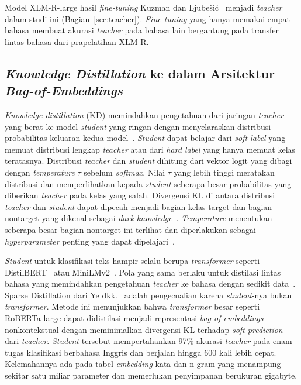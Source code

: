 \documentclass{ieeeaccess}
\newcommand{\en}[1]{\textit{#1}}
\begin{document}
Model XLM-R-large hasil \en{fine-tuning} Kuzman dan Ljube\v{s}i\'c~\cite{kuzman2025llm} menjadi \en{teacher} dalam studi ini (Bagian~\ref{sec:teacher}). \en{Fine-tuning} yang hanya memakai empat bahasa membuat akurasi \en{teacher} pada bahasa lain bergantung pada transfer lintas bahasa dari prapelatihan XLM-R.

\subsection{\en{Knowledge Distillation} ke dalam Arsitektur \en{Bag-of-Embeddings}}
\label{sec:rw-kd}
\en{Knowledge distillation} (KD) memindahkan pengetahuan dari jaringan \en{teacher} yang berat ke model \en{student} yang ringan dengan menyelaraskan distribusi probabilitas keluaran kedua model~\cite{hinton2015distilling,gou2021kdsurvey,gupta2022compression}. \en{Student} dapat belajar dari \en{soft label} yang memuat distribusi lengkap \en{teacher} atau dari \en{hard label} yang hanya memuat kelas teratasnya. Distribusi \en{teacher} dan \en{student} dihitung dari vektor logit yang dibagi dengan \en{temperature} $\tau$ sebelum \en{softmax}. Nilai $\tau$ yang lebih tinggi meratakan distribusi dan memperlihatkan kepada \en{student} seberapa besar probabilitas yang diberikan \en{teacher} pada kelas yang salah. Divergensi KL di antara distribusi \en{teacher} dan \en{student} dapat dipecah menjadi bagian kelas target dan bagian nontarget yang dikenal sebagai \en{dark knowledge}~\cite{zhao2022dkd}. \en{Temperature} menentukan seberapa besar bagian nontarget ini terlihat dan diperlakukan sebagai \en{hyperparameter} penting yang dapat dipelajari~\cite{li2023ctkd}.

\en{Student} untuk klasifikasi teks hampir selalu berupa \en{transformer} seperti DistilBERT~\cite{sanh2019distilbert} atau MiniLMv2~\cite{wang2021minilmv2}. Pola yang sama berlaku untuk distilasi lintas bahasa yang memindahkan pengetahuan \en{teacher} ke bahasa dengan sedikit data~\cite{piperno2025crosslingual}. Sparse Distillation dari Ye dkk.~\cite{ye2022sparse} adalah pengecualian karena \en{student}-nya bukan \en{transformer}. Metode ini menunjukkan bahwa \en{transformer} besar seperti RoBERTa-large dapat didistilasi menjadi representasi \en{bag-of-embeddings} nonkontekstual dengan meminimalkan divergensi KL terhadap \en{soft prediction} dari \en{teacher}. \en{Student} tersebut mempertahankan 97\% akurasi \en{teacher} pada enam tugas klasifikasi berbahasa Inggris dan berjalan hingga 600 kali lebih cepat. Kelemahannya ada pada tabel \en{embedding} kata dan n-gram yang menampung sekitar satu miliar parameter dan memerlukan penyimpanan berukuran gigabyte.
\end{document}

